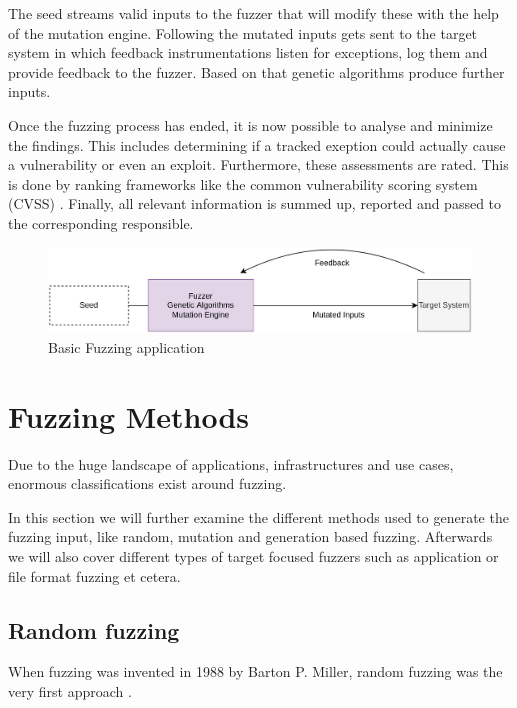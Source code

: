 \documentclass[journal=tosc,final]{iacrtrans}
\begin{document}
The seed streams valid inputs to the fuzzer that will modify these with the help of the mutation engine. Following the mutated inputs gets sent to the target system in which feedback instrumentations listen for exceptions, log them and provide feedback to the fuzzer. Based on that genetic algorithms produce further inputs.

Once the fuzzing process has ended, it is now possible to analyse and minimize the findings. This includes determining if a tracked exeption could actually cause a vulnerability or even an exploit. Furthermore, these assessments are rated. This is done by ranking frameworks like the common vulnerability scoring system (CVSS) \cite{nist}. Finally, all relevant information is summed up, reported and passed to the corresponding responsible. 
\begin{figure}
\caption{Basic Fuzzing application}
 \begin{shaded}

\begin{center}
\includegraphics[scale=0.2]{../final2.png}
\end{center}
\end{shaded}

\end{figure}

\section{Fuzzing Methods}
Due to the huge landscape of applications, infrastructures and use cases, enormous classifications exist around fuzzing. 

In this section we will further examine the different methods used to generate the fuzzing input, like random, mutation and generation based fuzzing. Afterwards we will also cover different types of target focused fuzzers such as application or file format fuzzing et cetera. 
\subsection{Random fuzzing}
When fuzzing was invented in 1988 by Barton P. Miller, random fuzzing was the very first approach \cite{info}.
\end{document}
